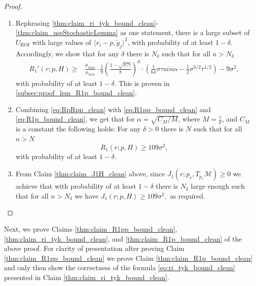 \documentclass[12pt]{article}
\theoremstyle{remark}
\newcommand{\MM}{\mathcal{M}}
\newcommand{\lrangle}[1]{\langle #1 \rangle}
\newcommand{\sM}{{M}}
\begin{document}
\begin{appendices}
\begin{proof}
\begin{enumerate}
\begin{align*}
    \geq
    \frac{n}{3}  \cdot\mu_{max}\cdot \mathrm{V}_{d} \cdot \rho^d 
    .\end{align*}
    \item\label{thm:claim_R1p_bound_clean} Rephrasing \ref{thm:claim_ri_tyk_bound_clean}-\ref{thm:claim_useStochasticLemma} as one statement, there is a large subset of $U_\textrm{ROI}$ with large values of $\lrangle{r_i - p, \tilde y_j}^2$, with probability of at least $1-\delta$.
    Accordingly, we show that for any $ \delta $ there is $ N_\delta $ such that for all $ n>N_\delta $ 
    \begin{align}
    R_1'(r; p, H) \geq  &\frac{\mu_{max}}{\mu_{min} }\cdot\frac{1}{9} \left(\frac{1-\sqrt{\sigma/\tau}}{ 8}\right)^d\cdot \left(\frac{1}{64}\sigma \tau sin\alpha - \frac{1}{2}\sigma^{3/2}\tau^{1/2} \right)  -9 \sigma^2
    \label{eq:R1p_bound_clean},\end{align}
    with probability of at least $1-\delta$.
    This is proven in \ref{subsec:proof_lem_R1p_bound_clean}.
    
    \item Combining \eqref{eq:RpRpp_clean} with \eqref{eq:R1pp_bound_clean} and \eqref{eq:R1p_bound_clean}, we get that for $\alpha = \sqrt{C_\sM/M}$, where $M = \frac{\tau}{\sigma}$, and $C_\sM$ is a constant the following holds:
    For any $ \delta > 0$ there is $ N $ such that for all $ n > N $
    \begin{equation}
        R_1(r;p,H) \geq 109 \sigma^2
    ,\end{equation}
    with probability of at least $1-\delta$.
    \item From Claim \ref{thm:claim_J1H_clean} above, since $J_1(r;{p_r},T_{p_r}\MM) \geq 0$ we achieve that with probability of at least $1-\delta$ there is $N_\delta$ large enough such that for all $ n > N_\delta $ we have
$
       J_1(r; p, H) \geq 109 \sigma^2  
    ,$
    as required.
    
\end{enumerate}

\end{proof}


Next, we prove Claims \ref{thm:claim_R1pp_bound_clean}, \ref{thm:claim_ri_tyk_bound_clean}, and \ref{thm:claim_R1p_bound_clean} of the above proof.
For clarity of presentation after proving Claim \ref{thm:claim_R1pp_bound_clean} we prove Claim \ref{thm:claim_R1p_bound_clean} and only then show the correctness of the formula \eqref{eq:ri_tyk_bound_clean} presented in Claim 
\ref{thm:claim_ri_tyk_bound_clean}.



\end{appendices}
\end{document}
